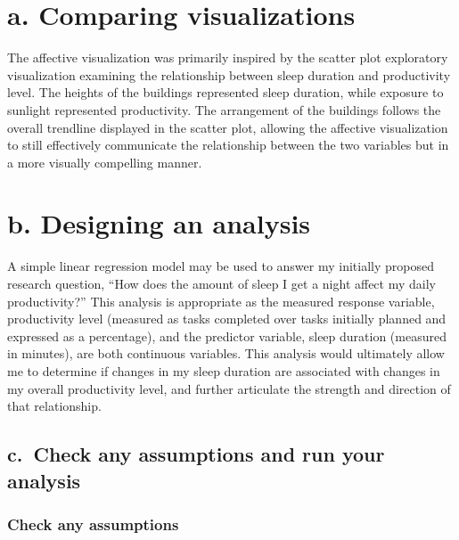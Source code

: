 \documentclass[
  letterpaper,
  DIV=11,
  numbers=noendperiod]{scrartcl}
\begin{document}
\section{a. Comparing visualizations}\label{a.-comparing-visualizations}

The affective visualization was primarily inspired by the scatter plot
exploratory visualization examining the relationship between sleep
duration and productivity level. The heights of the buildings
represented sleep duration, while exposure to sunlight represented
productivity. The arrangement of the buildings follows the overall
trendline displayed in the scatter plot, allowing the affective
visualization to still effectively communicate the relationship between
the two variables but in a more visually compelling manner.

\section{b. Designing an analysis}\label{b.-designing-an-analysis}

A simple linear regression model may be used to answer my initially
proposed research question, ``How does the amount of sleep I get a night
affect my daily productivity?'' This analysis is appropriate as the
measured response variable, productivity level (measured as tasks
completed over tasks initially planned and expressed as a percentage),
and the predictor variable, sleep duration (measured in minutes), are
both continuous variables. This analysis would ultimately allow me to
determine if changes in my sleep duration are associated with changes in
my overall productivity level, and further articulate the strength and
direction of that relationship.

\subsection{c.~Check any assumptions and run your
analysis}\label{c.-check-any-assumptions-and-run-your-analysis}

\subsubsection{Check any assumptions}\label{check-any-assumptions}
\end{document}
